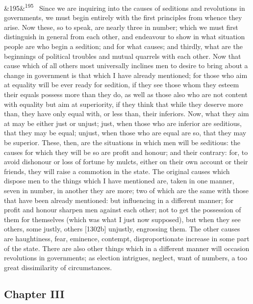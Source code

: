 \documentclass[12pt]{article}
\newcommand{\para}[1][]{\par\noindent\ifx&#1&\else\textsuperscript{\footnotesize #1}~\fi}
\begin{document}
\para[195] Since we are inquiring into the causes of seditions and revolutions in governments, we must begin entirely with the first principles from whence they arise. Now these, so to speak, are nearly three in number; which we must first distinguish in general from each other, and endeavour to show in what situation people are who begin a sedition; and for what causes; and thirdly, what are the beginnings of political troubles and mutual quarrels with each other. Now that cause which of all others most universally inclines men to desire to bring about a change in government is that which I have already mentioned; for those who aim at equality will be ever ready for sedition, if they see those whom they esteem their equals possess more than they do, as well as those also who are not content with equality but aim at superiority, if they think that while they deserve more than, they have only equal with, or less than, their inferiors. Now, what they aim at may be either just or unjust; just, when those who are inferior are seditious, that they may be equal; unjust, when those who are equal are so, that they may be superior. These, then, are the situations in which men will be seditious: the causes for which they will be so are profit and honour; and their contrary: for, to avoid dishonour or loss of fortune by mulcts, either on their own account or their friends, they will raise a commotion in the state. The original causes which dispose men to the things which I have mentioned are, taken in one manner, seven in number, in another they are more; two of which are the same with those that have been already mentioned: but influencing in a different manner; for profit and honour sharpen men against each other; not to get the possession of them for themselves (which was what I just now supposed), but when they see others, some justly, others [1302b] unjustly, engrossing them. The other causes are haughtiness, fear, eminence, contempt, disproportionate increase in some part of the state. There are also other things which in a different manner will occasion revolutions in governments; as election intrigues, neglect, want of numbers, a too great dissimilarity of circumstances.

\subsection*{Chapter III}
\end{document}
